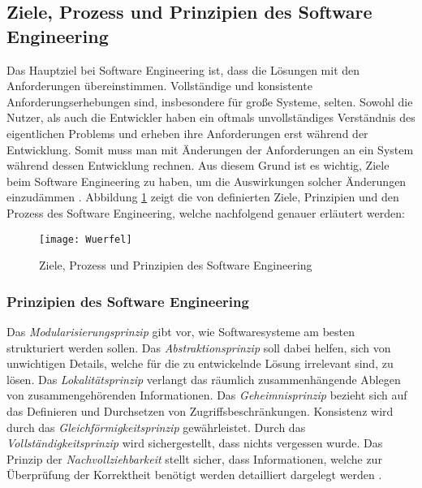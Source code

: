 \subsection{Ziele, Prozess und Prinzipien des Software Engineering}

Das Hauptziel bei Software Engineering ist, dass die Lösungen mit den Anforderungen übereinstimmen. Vollständige und konsistente Anforderungserhebungen sind, insbesondere für große Systeme, selten. Sowohl die Nutzer, als auch die Entwickler haben ein oftmals unvollständiges Verständnis des eigentlichen Problems und erheben ihre Anforderungen erst während der Entwicklung. Somit muss man mit Änderungen der Anforderungen an ein System während dessen Entwicklung rechnen. Aus diesem Grund ist es wichtig, Ziele beim Software Engineering zu haben, um die Auswirkungen solcher Änderungen einzudämmen \cite{Booch1993}.
Abbildung  \ref{fig:Wuerfel} zeigt die von \cite{ross1975software} definierten Ziele, Prinzipien und den Prozess des Software Engineering, welche nachfolgend genauer erläutert werden: 

\begin{figure}[htp]
\begin{center}
  \texttt{[image: Wuerfel]} %
  \caption{Ziele, Prozess und Prinzipien des Software Engineering  \cite{ross1975software}}
  \label{fig:Wuerfel}
\end{center}
\end{figure}

\subsubsection{Prinzipien des Software Engineering}


 Das \textit{Modularisierungsprinzip} gibt vor, wie Softwaresysteme am besten strukturiert werden sollen. Das \textit{Abstraktionsprinzip} soll dabei helfen, sich von unwichtigen Details, welche für die zu entwickelnde Lösung irrelevant sind, zu lösen. Das \textit{Lokalitätsprinzip} verlangt das räumlich zusammenhängende Ablegen von zusammengehörenden Informationen. Das \textit{Geheimnisprinzip} bezieht sich auf das Definieren und Durchsetzen von Zugriffsbeschränkungen. Konsistenz wird durch das \textit{Gleichförmigkeitsprinzip} gewährleistet. Durch das \textit{Vollständigkeitsprinzip} wird sichergestellt, dass nichts vergessen wurde. Das Prinzip der \textit{Nachvollziehbarkeit} stellt sicher, dass Informationen, welche zur Überprüfung der Korrektheit benötigt werden detailliert dargelegt werden \cite{ross1975software}.
 
